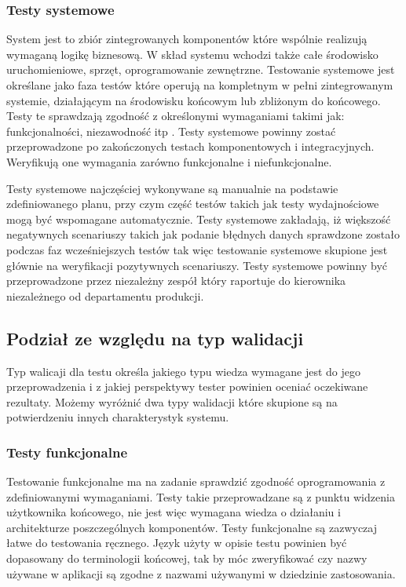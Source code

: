 \subsubsection{Testy systemowe}
System jest to zbiór zintegrowanych komponentów które wspólnie realizują wymaganą logikę biznesową. W skład systemu wchodzi także całe środowisko uruchomieniowe, sprzęt, oprogramowanie zewnętrzne. Testowanie systemowe jest określane jako faza testów które operują na kompletnym w pełni zintegrowanym systemie, działającym na środowisku końcowym lub zbliżonym do końcowego. Testy te sprawdzają zgodność z określonymi wymaganiami takimi jak: funkcjonalności, niezawodność itp
.
Testy systemowe powinny zostać przeprowadzone po  zakończonych testach  komponentowych i integracyjnych.  Weryfikują one wymagania zarówno funkcjonalne i niefunkcjonalne.

Testy systemowe najczęściej wykonywane są manualnie na podstawie zdefiniowanego planu, przy czym część testów takich jak testy wydajnościowe mogą być wspomagane automatycznie.
Testy systemowe zakładają, iż większość negatywnych scenariuszy takich jak podanie błędnych danych sprawdzone zostało podczas faz wcześniejszych testów tak więc testowanie systemowe skupione jest głównie na weryfikacji pozytywnych scenariuszy. 
Testy systemowe powinny być przeprowadzone przez niezależny zespół który raportuje do kierownika niezależnego od departamentu produkcji. 



\subsection{Podział ze względu na typ walidacji}
Typ walicaji dla testu określa jakiego typu wiedza wymagane jest do jego przeprowadzenia i z jakiej perspektywy tester powinien oceniać oczekiwane rezultaty. Możemy wyróżnić dwa typy walidacji które skupione są na potwierdzeniu innych charakterystyk systemu.
\subsubsection{Testy funkcjonalne}
Testowanie funkcjonalne ma na zadanie sprawdzić zgodność oprogramowania z zdefiniowanymi wymaganiami. Testy takie przeprowadzane są z punktu widzenia użytkownika końcowego, nie jest więc wymagana wiedza o działaniu i architekturze poszczególnych komponentów. Testy funkcjonalne są  zazwyczaj łatwe do testowania ręcznego. Język użyty w opisie testu powinien być dopasowany do terminologii końcowej, tak by móc zweryfikować czy nazwy używane w aplikacji są zgodne z nazwami używanymi w dziedzinie zastosowania.

